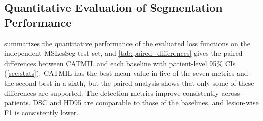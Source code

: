 \subsection{Quantitative Evaluation of Segmentation Performance}

\begin{table}[t]
\centering
\caption{Comparison of CATMIL with standard losses and the instance-level
loss CC-DiceCE on the MSLesSeg test set, without post-processing. Values
are the mean $\pm$ sample standard deviation over the five fold models.
Best values are shown in \textbf{bold}; second-best values are
\underline{underlined}.}
\label{tab:loss_comparison_small_lesion}
\end{table}

 summarizes the quantitative
performance of the evaluated loss functions on the independent MSLesSeg
test set, and \cref{tab:paired_differences} gives the paired differences
between CATMIL and each baseline with patient-level 95\% CIs
(\cref{sec:stats}). CATMIL has the best mean value in five of the seven
metrics and the second-best in a sixth, but the paired analysis shows that
only some of these differences are supported. The detection metrics
improve consistently across patients. DSC and HD95 are comparable to those
of the baselines, and lesion-wise F1 is consistently lower.

